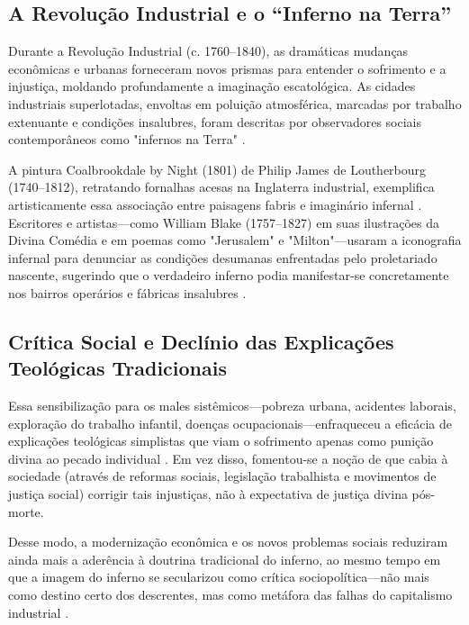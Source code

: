 \subsection{A Revolução Industrial e o “Inferno na Terra”}

Durante a Revolução Industrial (c. 1760--1840), as dramáticas mudanças econômicas e urbanas forneceram novos prismas para entender o sofrimento e a injustiça, moldando profundamente a imaginação escatológica. As cidades industriais superlotadas, envoltas em poluição atmosférica, marcadas por trabalho extenuante e condições insalubres, foram descritas por observadores sociais contemporâneos como "infernos na Terra" \cite{Engels1845}.

A pintura Coalbrookdale by Night (1801) de Philip James de Loutherbourg (1740--1812), retratando fornalhas acesas na Inglaterra industrial, exemplifica artisticamente essa associação entre paisagens fabris e imaginário infernal \cite{Loutherbourg1801}. Escritores e artistas---como William Blake (1757--1827) em suas ilustrações da Divina Comédia e em poemas como "Jerusalem" e "Milton"---usaram a iconografia infernal para denunciar as condições desumanas enfrentadas pelo proletariado nascente, sugerindo que o verdadeiro inferno podia manifestar-se concretamente nos bairros operários e fábricas insalubres \cite{Blake1804}.

\subsection{Crítica Social e Declínio das Explicações Teológicas Tradicionais}

Essa sensibilização para os males sistêmicos---pobreza urbana, acidentes laborais, exploração do trabalho infantil, doenças ocupacionais---enfraqueceu a eficácia de explicações teológicas simplistas que viam o sofrimento apenas como punição divina ao pecado individual \cite{Thompson1963}. Em vez disso, fomentou-se a noção de que cabia à sociedade (através de reformas sociais, legislação trabalhista e movimentos de justiça social) corrigir tais injustiças, não à expectativa de justiça divina pós-morte.

Desse modo, a modernização econômica e os novos problemas sociais reduziram ainda mais a aderência à doutrina tradicional do inferno, ao mesmo tempo em que a imagem do inferno se secularizou como crítica sociopolítica---não mais como destino certo dos descrentes, mas como metáfora das falhas do capitalismo industrial \cite{Hobsbawm1962}.

